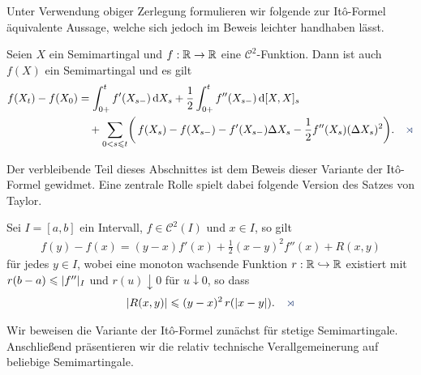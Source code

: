 Unter Verwendung obiger Zerlegung formulieren wir folgende zur
Itô-Formel äquivalente Aussage, welche sich jedoch im Beweis leichter handhaben
lässt.

\begin{prop*}
Seien $X$ ein Semimartingal und $f:\mathbb{R}\to\mathbb{R}$ eine $\mathcal{C}^2$-Funktion. Dann
ist auch $f(X)$ ein Semimartingal und es gilt
\begin{align*}
f(X_t)-f(X_0) 
  & = \int_{0+}^t f'(X_{s-})\dX_s + \frac{1}{2} \int_{0+}^t f''(X_{s-})\,
  \diffd[X,X]_s \\
  & \quad + \sum_{0<s\le t} \biggl(\,f(X_s)-f(X_{s-}) -f'(X_{s-}) \Delta
  X_s - \frac{1}{2}f''(X_s)(\Delta X_s)^2\biggr).\fish
\end{align*}
\end{prop*}

Der verbleibende Teil dieses Abschnittes ist dem Beweis dieser Variante der
Itô-Formel gewidmet.
 Eine zentrale Rolle spielt dabei folgende Version des
Satzes von Taylor.

\begin{prop*}
Sei $I=[a,b]$ ein Intervall, $f\in\mathcal{C}^2(I)$ und $x\in I$, so gilt 
\begin{align*}
f(y)-f(x) = (y-x)f'(x) + \frac{1}{2}(x-y)^2f''(x) + R(x,y)
\end{align*}
für jedes $y\in I$, wobei eine monoton wachsende Funktion $r: \mathbb{R}\hookrightarrow \mathbb{R}$
existiert mit $r(b-a) \leqslant \lvert f''\rvert_I$ und $r(u)\downarrow 0$ für $u\downarrow
0$, so dass
\begin{align*}
\abs{R(x,y)} \le (y-x)^2\, r(\abs{x-y}).\fish
\end{align*}
\end{prop*}

Wir beweisen die Variante der Itô-Formel zunächst für stetige Semimartingale.
Anschließend präsentieren wir die relativ technische Verallgemeinerung auf
beliebige Semimartingale.


